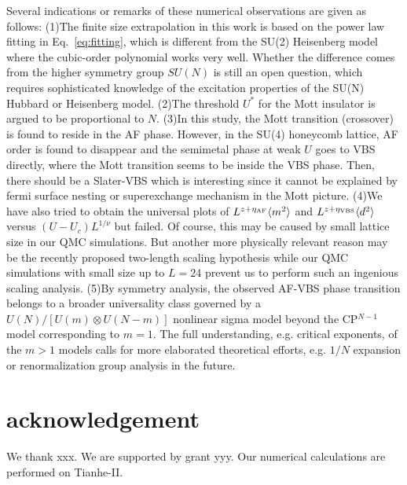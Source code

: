 \documentclass[twocolumn,superscriptaddress,prb]{revtex4-1}
\begin{document}
Several indications or remarks of these numerical observations are given as follows: 
(1)The finite size extrapolation in this work is based on the power law fitting in Eq.~\ref{eq:fitting}, which is different from the SU(2) Heisenberg model where the cubic-order polynomial works very well. \cite{Neuberger_PRB_1989,*Sandvik_PRB_1997} Whether the difference comes from the higher symmetry group $SU(N)$ is still an open question, which requires sophisticated knowledge of the excitation properties of the SU(N) Hubbard or Heisenberg model. 
(2)The threshold $U^*$ for the Mott insulator is argued to be proportional to $N$. \cite{Zhou_PRB_2016}
(3)In this study, the Mott transition (crossover) is found to reside in the AF phase. However, in the SU(4) honeycomb lattice, AF order is found to disappear and the semimetal phase at weak $U$ goes to VBS directly, where the Mott transition seems to be inside the VBS phase. \cite{Zhou_PRB_2016} Then, there should be a Slater-VBS which is interesting since it cannot be explained by fermi surface nesting or superexchange mechanism in the Mott picture. 
(4)We have also tried to obtain the universal plots of $L^{z+\eta_{\rm AF}}\langle m^2 \rangle$ and $L^{z+\eta_{\rm VBS}}\langle d^2 \rangle$ versus $(U-U_c)L^{1/\nu}$ but failed. Of course, this may be caused by small lattice size in our QMC simulations. But another more physically relevant reason may be the recently proposed two-length scaling hypothesis \cite{Shao_S_2016} while our QMC simulations with small size up to $L=24$ prevent us to perform such an ingenious scaling analysis.
(5)By symmetry analysis, the observed AF-VBS phase transition belongs to a broader universality class governed by a $U(N)/[U(m)\otimes U(N-m)]$ nonlinear sigma model beyond the CP$^{N-1}$ model corresponding to $m=1$. The full understanding, e.g. critical exponents, of the $m>1$ models calls for more elaborated theoretical efforts, e.g. $1/N$ expansion \cite{Wang_a_2018} or renormalization group analysis in the future.


\section{acknowledgement}
We thank xxx.
We are supported by grant yyy.
Our numerical calculations are performed on Tianhe-II. 


\end{document}
